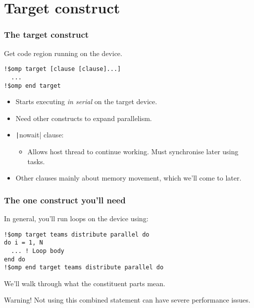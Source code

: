 \documentclass{beamer}
\begin{document}
\section{Target construct}
\begin{frame}[fragile]
\frametitle{The target construct}

Get code region running on the device.

\begin{verbatim}
!$omp target [clause [clause]...]
  ...
!$omp end target 
\end{verbatim}
\begin{itemize}
  \item Starts executing \emph{in serial} on the target device.
  \item Need other constructs to expand parallelism.
  \item \texttt|nowait| clause:
    \begin{itemize}
      \item Allows host thread to continue working. Must synchronise later using tasks.
    \end{itemize}
  \item Other clauses mainly about memory movement, which we'll come to later.
\end{itemize}
\end{frame}

\begin{frame}[fragile]
\frametitle{The one construct you'll need}
In general, you'll run loops on the device using:
\begin{verbatim}
!$omp target teams distribute parallel do
do i = 1, N
  ... ! Loop body
end do
!$omp end target teams distribute parallel do
\end{verbatim}

\vfill

We'll walk through what the constituent parts mean.

\vfill

\begin{alertblock}{Warning!}
Not using this combined statement can have severe performance issues.
\end{alertblock}
\end{frame}
\end{document}
